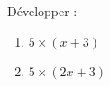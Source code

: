 
\begin{mental}
    Développer :
    \begin{enumerate}
        \item
            \( 5\times (x+3)\)
        \item
            \( 5\times (2x+3)\)
    \end{enumerate}
\end{mental}
